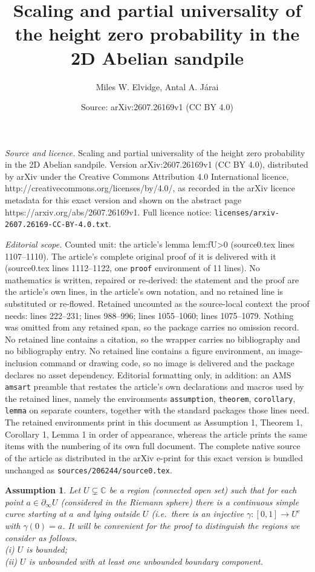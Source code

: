 \documentclass[10pt,a4paper]{amsart}
\title{Scaling and partial universality of the height zero probability in the 2D Abelian sandpile}
\author{Miles W. Elvidge, Antal A. J\'arai}
\date{Source: arXiv:2607.26169v1 (CC BY 4.0)}
\newtheorem{assumption}{Assumption}
\begin{document}
\maketitle

\noindent\emph{Source and licence.} Scaling and partial universality of the height zero probability in the 2D Abelian sandpile. Version arXiv:2607.26169v1 (CC BY 4.0), distributed by arXiv under the Creative Commons Attribution 4.0 International licence, http://creativecommons.org/licenses/by/4.0/, as recorded in the arXiv licence metadata for this exact version and shown on the abstract page https://arxiv.org/abs/2607.26169v1. Full licence notice: \texttt{licenses/arxiv-2607.26169-CC-BY-4.0.txt}.\par\smallskip

\noindent\textit{Editorial scope.} Counted unit: the article's lemma lem:fU>0 (source0.tex lines 1107--1110). The article's complete original proof of it is delivered with it (source0.tex lines 1112--1122, one \texttt{proof} environment of 11 lines). No mathematics is written, repaired or re-derived: the statement and the proof are the article's own lines, in the article's own notation, and no retained line is substituted or re-flowed.  Retained uncounted as the source-local context the proof needs: lines 222--231; lines 988--996; lines 1055--1060; lines 1075--1079.  Nothing was omitted from any retained span, so the package carries no omission record.  No retained line contains a citation, so the wrapper carries no bibliography and no bibliography entry.  No retained line contains a figure environment, an image-inclusion command or drawing code, so no image is delivered and the package declares no asset dependency.  Editorial formatting only, in addition: an AMS \texttt{amsart} preamble that restates the article's own declarations and macros used by the retained lines, namely the environments \texttt{assumption}, \texttt{theorem}, \texttt{corollary}, \texttt{lemma} on separate counters, together with the standard packages those lines need.  The retained environments print in this document as Assumption 1, Theorem 1, Corollary 1, Lemma 1 in order of appearance, whereas the article prints the same items with the numbering of its own full document.  The complete native source of the article as distributed in the arXiv e-print for this exact version is bundled unchanged as \texttt{sources/206244/source0.tex}.
\begin{assumption}
\label{a:U} 
Let $U \subsetneq \mathbb{C}$ be a region (connected open set) such that for each point
$a \in \partial_\infty U$ (considered in the Riemann sphere) there is a continuous simple
curve starting at $a$ and lying outside $U$ (i.e.~there is an injective 
$\gamma: [0,1] \to U^c$ with $\gamma(0) = a$.
It will be convenient for the proof to distinguish the regions we consider as follows. \ \\
(i) $U$ is bounded; \\
(ii) $U$ is unbounded with at least one unbounded boundary component.
\end{assumption}
\end{document}
